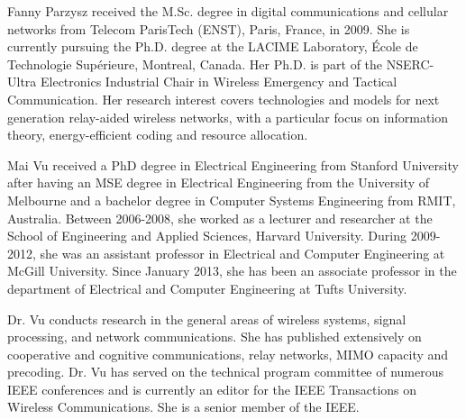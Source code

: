 \documentclass[journal]{IEEEtran}
\theoremstyle{definition}
\begin{document}
\begin{IEEEbiography}{Fanny Parzysz}
received the M.Sc. degree in digital communications and cellular networks from Telecom ParisTech (ENST), Paris, France, in 2009. She is currently pursuing the Ph.D. degree at the LACIME Laboratory, \'{E}cole de Technologie Sup\'{e}rieure, Montreal, Canada. Her Ph.D. is part of the NSERC-Ultra Electronics Industrial Chair in Wireless Emergency and Tactical Communication. 
Her research interest covers technologies and models for next generation relay-aided wireless networks, with a particular focus on information theory, energy-efficient coding and resource allocation.
\end{IEEEbiography}
\vfill
\newpage
\begin{IEEEbiography}{Mai Vu}
received a PhD degree in Electrical Engineering from Stanford University after having an MSE degree in Electrical Engineering from the University of Melbourne and a bachelor degree in Computer Systems Engineering from RMIT, Australia. Between 2006-2008, she worked as a lecturer and researcher at the School of Engineering and Applied Sciences, Harvard University. During 2009-2012, she was an assistant professor in Electrical and Computer Engineering at McGill University. Since January 2013, she has been an associate professor in the department of Electrical and Computer Engineering at Tufts University.

Dr. Vu conducts research in the general areas of wireless systems, signal processing, and network communications. She has published extensively on cooperative and cognitive communications, relay networks, MIMO capacity and precoding. Dr. Vu has served on the technical program committee of numerous IEEE conferences and is
currently an editor for the IEEE Transactions on Wireless Communications. She is a senior member of the IEEE.
\end{IEEEbiography}
\end{document}
